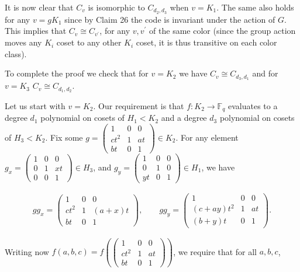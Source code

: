 \documentclass[10pt,a4paper]{article}
\begin{document}
It is now clear that $C_{v}$ is isomorphic to $C_{d_{2},d_{3}}$ when $v=K_{1}$.
The same also holds for any $v=gK_{1}$ since by Claim 26 the code is invariant under the action of $G$. This implies that $C_{v}\cong C_{v^{\prime}}$, for any $v,v^{\prime}$ of the same color (since the group action moves any $K_{i}$ coset to any other $K_{i}$ coset, it is thus transitive on each color class).\par




To complete the proof we check that for $v=K_{2}$ we have $C_{v}\cong C_{d_{3},d_{1}}$ and for $v=K_{3}$ $C_{v}\cong C_{d_{1},d_{2}}$.\par




Let us start with $v=K_{2}$. Our requirement is that $f:K_{2}\to\mathbb{F}_{q}$ evaluates to a degree $d_{1}$ polynomial on cosets of $H_{1}<K_{2}$ and a degree $d_{3}$ polynomial on cosets of $H_{3}<K_{2}$.
Fix some $g=\begin{pmatrix}1&0&0\\
ct^{2}&1&at\\
bt&0&1\end{pmatrix}\in K_{2}$. For any element $g_{x}=\begin{pmatrix}1&0&0\\
0&1&xt\\
0&0&1\end{pmatrix}\in H_{3}$, and $g_{y}=\begin{pmatrix}1&0&0\\
0&1&0\\
yt&0&1\end{pmatrix}\in H_{1}$, we have\par


\[\begin{gathered}
gg_{x}=\begin{pmatrix}1&0&0\\
ct^{2}&1&(a+x)t\\
bt&0&1\end{pmatrix},\qquad gg_{y}=\begin{pmatrix}1&0&0\\
(c+ay)t^{2}&1&at\\
(b+y)t&0&1\end{pmatrix}.
\end{gathered}\]


Writing now $f(a,b,c)=f\left(\begin{pmatrix}1&0&0\\
ct^{2}&1&at\\
bt&0&1\end{pmatrix}\right)$, we require that for all $a,b,c$,\par
\end{document}

